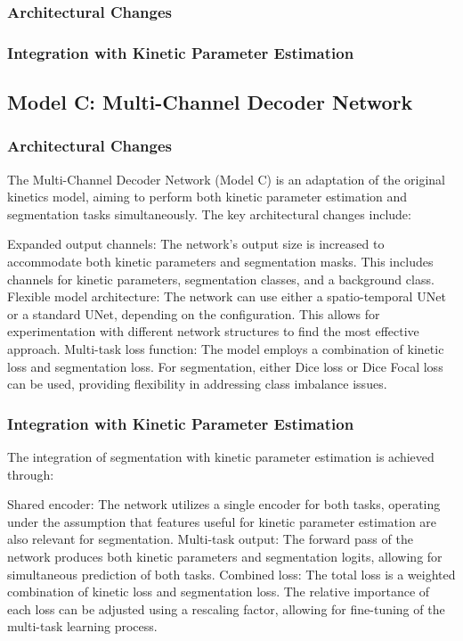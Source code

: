 \subsubsection{Architectural Changes}
\subsubsection{Integration with Kinetic Parameter Estimation}




\subsection{Model C: Multi-Channel Decoder Network}
\subsubsection{Architectural Changes}
The Multi-Channel Decoder Network (Model C) is an adaptation of the original kinetics model, aiming to perform both kinetic parameter estimation and segmentation tasks simultaneously. The key architectural changes include:

Expanded output channels: The network's output size is increased to accommodate both kinetic parameters and segmentation masks. This includes channels for kinetic parameters, segmentation classes, and a background class.
Flexible model architecture: The network can use either a spatio-temporal UNet or a standard UNet, depending on the configuration. This allows for experimentation with different network structures to find the most effective approach.
Multi-task loss function: The model employs a combination of kinetic loss and segmentation loss. For segmentation, either Dice loss or Dice Focal loss can be used, providing flexibility in addressing class imbalance issues.

\subsubsection{Integration with Kinetic Parameter Estimation}
The integration of segmentation with kinetic parameter estimation is achieved through:

Shared encoder: The network utilizes a single encoder for both tasks, operating under the assumption that features useful for kinetic parameter estimation are also relevant for segmentation.
Multi-task output: The forward pass of the network produces both kinetic parameters and segmentation logits, allowing for simultaneous prediction of both tasks.
Combined loss: The total loss is a weighted combination of kinetic loss and segmentation loss. The relative importance of each loss can be adjusted using a rescaling factor, allowing for fine-tuning of the multi-task learning process.

